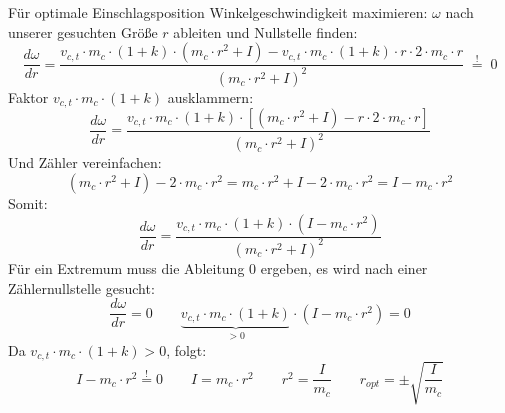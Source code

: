 Für optimale Einschlagsposition Winkelgeschwindigkeit maximieren: $\omega$ nach unserer gesuchten Größe $r$ ableiten und Nullstelle finden:
\[
\frac{d\omega}{dr} = \frac{v_{c,t} \cdot m_c \cdot (1 + k) \cdot (m_c \cdot r^2 + I) - v_{c,t} \cdot m_c \cdot (1 + k) \cdot r \cdot 2 \cdot m_c \cdot r}{(m_c \cdot r^2 + I)^2} \; \overset{!}{=} \; 0
\]
Faktor $v_{c,t} \cdot m_c \cdot (1 + k)$ ausklammern:
\[
\frac{d\omega}{dr} = \frac{v_{c,t} \cdot m_c \cdot (1 + k) \cdot \left[(m_c \cdot r^2 + I) - r \cdot 2 \cdot m_c \cdot r\right]}{(m_c \cdot r^2 + I)^2}
\]
Und Zähler vereinfachen:
\[
(m_c \cdot r^2 + I) - 2 \cdot m_c \cdot r^2 = m_c \cdot r^2 + I - 2 \cdot m_c \cdot r^2 = I - m_c \cdot r^2
\]
Somit:
\[
\frac{d\omega}{dr} = \frac{v_{c,t} \cdot m_c \cdot (1 + k) \cdot (I - m_c \cdot r^2)}{(m_c \cdot r^2 + I)^2}
\]
Für ein Extremum muss die Ableitung 0 ergeben, es wird nach einer Zählernullstelle gesucht: 
\[
\frac{d\omega}{dr} = 0 \qquad \underbrace{v_{c,t} \cdot m_c \cdot (1 + k)}_{>0} \cdot (I - m_c \cdot r^2) = 0
\]
Da $v_{c,t} \cdot m_c \cdot (1 + k) > 0$, folgt:
\[
I - m_c \cdot r^2 \overset{!}{=} 0 \qquad I = m_c \cdot r^2 \qquad r^2 = \frac{I}{m_c} \qquad r_{opt} = \pm \sqrt{\frac{I}{m_c}}
\]

